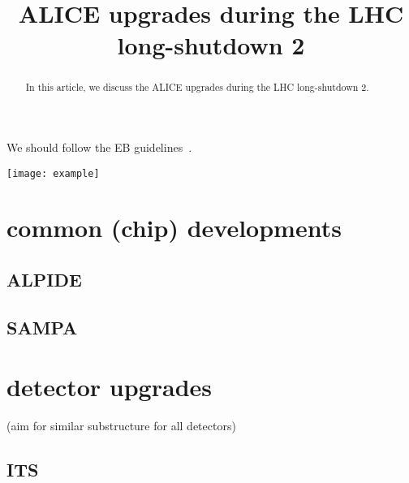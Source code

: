 \documentclass[ALICE,manyauthors]{cernphprep}
\begin{document}
\begin{titlepage}

\title{ALICE upgrades during the LHC long-shutdown 2}


\begin{abstract}
In this article, we discuss the ALICE upgrades during the LHC long-shutdown 2.
\end{abstract}
\end{titlepage}

\setcounter{page}{2} %

\tableofcontents
\listoffigures

We should follow the EB guidelines~\cite{EBGuidelineEditing}.

\texttt{[image: example]}





\section{common (chip) developments}
\subsection{ALPIDE}
\subsection{SAMPA}

\section{detector upgrades}
(aim for similar substructure for all detectors)
\subsection{ITS}
\end{document}
